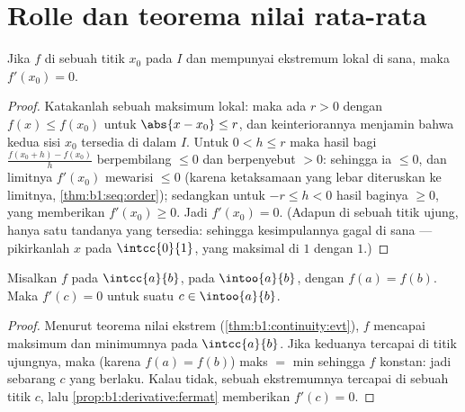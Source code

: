 \section{Rolle dan teorema nilai rata-rata}

\begin{proposition}\label{prop:b1:derivative:fermat}
Jika $f$  di sebuah titik \emph{} $x_0$ pada $I$ dan
mempunyai ekstremum lokal di sana, maka $f'(x_0) = 0$.
\end{proposition}

\begin{proof}
Katakanlah sebuah maksimum lokal: maka ada $r > 0$ dengan $f(x) \leq f(x_0)$
untuk $\abs{x - x_0} \leq r$, dan keinteriorannya menjamin bahwa kedua
sisi $x_0$ tersedia di dalam $I$. Untuk $0 < h \leq r$ maka
hasil bagi $\frac{f(x_0 + h) - f(x_0)}{h}$ berpembilang $\leq 0$
dan berpenyebut $> 0$: sehingga ia $\leq 0$, dan limitnya $f'(x_0)$
mewarisi $\leq 0$ (karena ketaksamaan yang lebar diteruskan ke limitnya,
\cref{thm:b1:seq:order}); sedangkan untuk $-r \leq h < 0$ hasil baginya
$\geq 0$, yang memberikan $f'(x_0) \geq 0$. Jadi $f'(x_0) = 0$. (Adapun di sebuah
titik ujung, hanya satu tandanya yang tersedia: sehingga kesimpulannya gagal di sana ---
pikirkanlah $x$ pada $\intcc{0}{1}$, yang maksimal di $1$ dengan 
$1$.)
\end{proof}

\begin{theorem}[Rolle]\label{thm:b1:derivative:rolle}
Misalkan $f$  pada $\intcc{a}{b}$,  pada
$\intoo{a}{b}$, dengan $f(a) = f(b)$. Maka $f'(c) = 0$ untuk suatu $c \in
\intoo{a}{b}$.
\end{theorem}

\begin{proof}
Menurut teorema nilai ekstrem (\cref{thm:b1:continuity:evt}), $f$
mencapai maksimum dan minimumnya pada $\intcc{a}{b}$. Jika keduanya
tercapai di titik ujungnya, maka (karena $f(a) = f(b)$) maks $=$ min sehingga $f$
konstan: jadi sebarang $c$ yang  berlaku. Kalau tidak, sebuah ekstremumnya
tercapai di sebuah titik  $c$, lalu
\cref{prop:b1:derivative:fermat} memberikan $f'(c) = 0$.
\end{proof}

